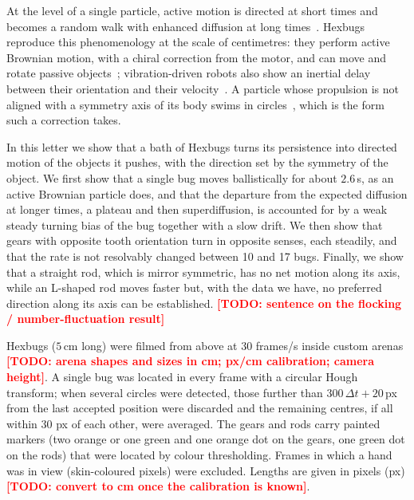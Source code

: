 \documentclass[11pt]{article}
\newcommand{\todo}[1]{\textcolor{red}{\textbf{[TODO: #1]}}}
\begin{document}
At the level of a single particle, active motion is directed at short times and becomes a random walk with enhanced diffusion at long times~\cite{Howse2007,tenHagen2011}.
Hexbugs reproduce this phenomenology at the scale of centimetres: they perform active Brownian motion, with a chiral correction from the motor, and can move and rotate passive objects~\cite{Balda2022}; vibration-driven robots also show an inertial delay between their orientation and their velocity~\cite{Scholz2018}.
A particle whose propulsion is not aligned with a symmetry axis of its body swims in circles~\cite{Kummel2013}, which is the form such a correction takes.

In this letter we show that a bath of Hexbugs turns its persistence into directed motion of the objects it pushes, with the direction set by the symmetry of the object.
We first show that a single bug moves ballistically for about $2.6\,$s, as an active Brownian particle does, and that the departure from the expected diffusion at longer times, a plateau and then superdiffusion, is accounted for by a weak steady turning bias of the bug together with a slow drift.
We then show that gears with opposite tooth orientation turn in opposite senses, each steadily, and that the rate is not resolvably changed between 10 and 17 bugs.
Finally, we show that a straight rod, which is mirror symmetric, has no net motion along its axis, while an L-shaped rod moves faster but, with the data we have, no preferred direction along its axis can be established.
\todo{sentence on the flocking / number-fluctuation result}

\bigskip
\noindent Hexbugs ($5\,$cm long) were filmed from above at 30 frames/s inside custom arenas \todo{arena shapes and sizes in cm; px/cm calibration; camera height}.
A single bug was located in every frame with a circular Hough transform; when several circles were detected, those further than $300\,\Delta t+20\,$px from the last accepted position were discarded and the remaining centres, if all within 30 px of each other, were averaged.
The gears and rods carry painted markers (two orange or one green and one orange dot on the gears, one green dot on the rods) that were located by colour thresholding.
Frames in which a hand was in view (skin-coloured pixels) were excluded.
Lengths are given in pixels (px) \todo{convert to cm once the calibration is known}.
\end{document}
